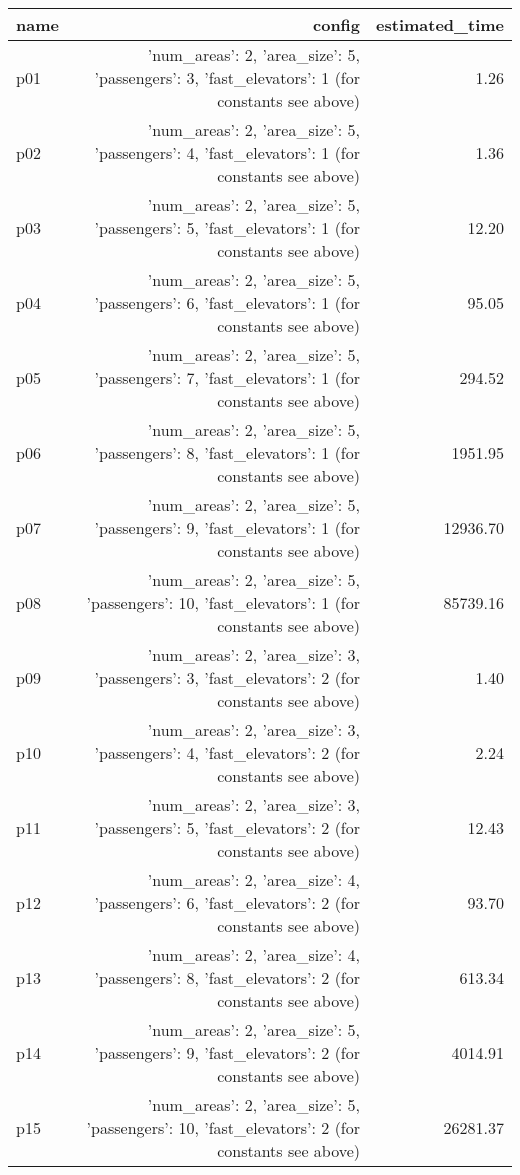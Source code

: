 \documentclass{article}
\begin{document}
                            \begin{center}
                            \scriptsize
                            \begin{tabular}{@{}l|r|r@{}}
                            name & config & estimated\_time\\\midrule
                              p01&{'num\_areas': 2, 'area\_size': 5, 'passengers': 3, 'fast\_elevators': 1 (for constants see above)}&1.26\\
  p02&{'num\_areas': 2, 'area\_size': 5, 'passengers': 4, 'fast\_elevators': 1 (for constants see above)}&1.36\\
  p03&{'num\_areas': 2, 'area\_size': 5, 'passengers': 5, 'fast\_elevators': 1 (for constants see above)}&12.20\\
  p04&{'num\_areas': 2, 'area\_size': 5, 'passengers': 6, 'fast\_elevators': 1 (for constants see above)}&95.05\\
  p05&{'num\_areas': 2, 'area\_size': 5, 'passengers': 7, 'fast\_elevators': 1 (for constants see above)}&294.52\\
  p06&{'num\_areas': 2, 'area\_size': 5, 'passengers': 8, 'fast\_elevators': 1 (for constants see above)}&1951.95\\
  p07&{'num\_areas': 2, 'area\_size': 5, 'passengers': 9, 'fast\_elevators': 1 (for constants see above)}&12936.70\\
  p08&{'num\_areas': 2, 'area\_size': 5, 'passengers': 10, 'fast\_elevators': 1 (for constants see above)}&85739.16\\
  p09&{'num\_areas': 2, 'area\_size': 3, 'passengers': 3, 'fast\_elevators': 2 (for constants see above)}&1.40\\
  p10&{'num\_areas': 2, 'area\_size': 3, 'passengers': 4, 'fast\_elevators': 2 (for constants see above)}&2.24\\
  p11&{'num\_areas': 2, 'area\_size': 3, 'passengers': 5, 'fast\_elevators': 2 (for constants see above)}&12.43\\
  p12&{'num\_areas': 2, 'area\_size': 4, 'passengers': 6, 'fast\_elevators': 2 (for constants see above)}&93.70\\
  p13&{'num\_areas': 2, 'area\_size': 4, 'passengers': 8, 'fast\_elevators': 2 (for constants see above)}&613.34\\
  p14&{'num\_areas': 2, 'area\_size': 5, 'passengers': 9, 'fast\_elevators': 2 (for constants see above)}&4014.91\\
  p15&{'num\_areas': 2, 'area\_size': 5, 'passengers': 10, 'fast\_elevators': 2 (for constants see above)}&26281.37\\

\end{tabular}
\end{center}
\end{document}
